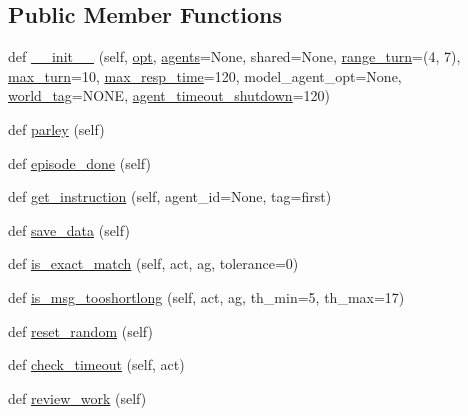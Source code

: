 \subsection*{Public Member Functions}
\begin{DoxyCompactItemize}
\item 
def \hyperlink{classpersonachat__eval_1_1worlds_1_1PersonaChatEvalWorld_a84445a3daf6d694a74e90e3ca0ba65dd}{\+\_\+\+\_\+init\+\_\+\+\_\+} (self, \hyperlink{classparlai_1_1core_1_1worlds_1_1World_a3640d92718acd3e6942a28c1ab3678bd}{opt}, \hyperlink{classparlai_1_1core_1_1worlds_1_1MultiAgentDialogWorld_a05fc93525cb86edef121980fc55f9926}{agents}=None, shared=None, \hyperlink{classpersonachat__eval_1_1worlds_1_1PersonaChatEvalWorld_a5207a70758bc6eb4943e27e784f68073}{range\+\_\+turn}=(4, 7), \hyperlink{classpersonachat__eval_1_1worlds_1_1PersonaChatEvalWorld_ab70b116a8516577ca23c3243d1b54f07}{max\+\_\+turn}=10, \hyperlink{classpersonachat__eval_1_1worlds_1_1PersonaChatEvalWorld_af539606fe73799a280c061ed2cdf221b}{max\+\_\+resp\+\_\+time}=120, model\+\_\+agent\+\_\+opt=None, \hyperlink{classpersonachat__eval_1_1worlds_1_1PersonaChatEvalWorld_a47e3c2213ce2f77d7aafe62aaf771328}{world\+\_\+tag}=\textquotesingle{}N\+O\+NE\textquotesingle{}, \hyperlink{classpersonachat__eval_1_1worlds_1_1PersonaChatEvalWorld_abec22d8906eed060d0a9f61d414f3902}{agent\+\_\+timeout\+\_\+shutdown}=120)
\item 
def \hyperlink{classpersonachat__eval_1_1worlds_1_1PersonaChatEvalWorld_ac004d69692fbc9b4f0c1c88525de052a}{parley} (self)
\item 
def \hyperlink{classpersonachat__eval_1_1worlds_1_1PersonaChatEvalWorld_a4adecbc6dcc81ec27b249956d9d8efbf}{episode\+\_\+done} (self)
\item 
def \hyperlink{classpersonachat__eval_1_1worlds_1_1PersonaChatEvalWorld_adc9e9dea06a5ede71146239f46957840}{get\+\_\+instruction} (self, agent\+\_\+id=None, tag=\textquotesingle{}first\textquotesingle{})
\item 
def \hyperlink{classpersonachat__eval_1_1worlds_1_1PersonaChatEvalWorld_a1e6d0c1ef81b0a0b4602d243560dece2}{save\+\_\+data} (self)
\item 
def \hyperlink{classpersonachat__eval_1_1worlds_1_1PersonaChatEvalWorld_a5d13b07cdfbfd8c54f458a25cf8019ef}{is\+\_\+exact\+\_\+match} (self, act, ag, tolerance=0)
\item 
def \hyperlink{classpersonachat__eval_1_1worlds_1_1PersonaChatEvalWorld_af434d8a5840ede3afeb33dd1695aecec}{is\+\_\+msg\+\_\+tooshortlong} (self, act, ag, th\+\_\+min=5, th\+\_\+max=17)
\item 
def \hyperlink{classpersonachat__eval_1_1worlds_1_1PersonaChatEvalWorld_ac1264c19866e4ecfa0f38f66c674c0d2}{reset\+\_\+random} (self)
\item 
def \hyperlink{classpersonachat__eval_1_1worlds_1_1PersonaChatEvalWorld_a679af39a8c51b3721340baea526f1f41}{check\+\_\+timeout} (self, act)
\item 
def \hyperlink{classpersonachat__eval_1_1worlds_1_1PersonaChatEvalWorld_a64b6b480061fb606fa41cf6c8b21b943}{review\+\_\+work} (self)
\end{DoxyCompactItemize}

